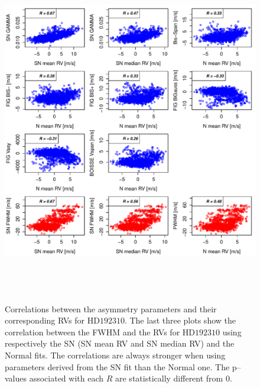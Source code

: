 \documentclass{aa}
\begin{document}
\begin{figure}[htbp]
\begin{center}
\includegraphics[height = 6in]{HD19231_[4]Comparison_para.pdf} 
   \caption{Correlations between the asymmetry parameters and their corresponding RVs for $\text{HD}192310$.  The last three plots show the correlation between the FWHM and the RVs for $\text{HD}192310$ using respectively the SN (SN mean RV and SN median RV) and the Normal fits. The correlations are always stronger when using parameters derived from the SN fit than the Normal one. The p--values associated with each $R$ are statistically different from $0$.}   
   \label{fig:Gliese785:corrPlot}
\end{center}
\end{figure}
\end{document}
